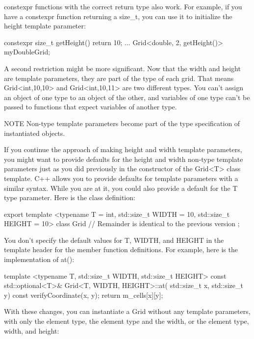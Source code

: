 constexpr functions with the correct return type also work. For example, if you have a constexpr function returning a size\_t, you can use it to initialize the height template parameter:

\begin{cpp}
constexpr size_t getHeight() { return 10; }
...
Grid<double, 2, getHeight()> myDoubleGrid;
\end{cpp}

A second restriction might be more significant. Now that the width and height are template parameters, they are part of the type of each grid. That means Grid<int,10,10> and Grid<int,10,11> are two different types. You can’t assign an object of one type to an object of the other, and variables of one type can’t be passed to functions that expect variables of another type.

\begin{myNotic}{NOTE}
Non-type template parameters become part of the type specification of instantiated objects.
\end{myNotic}


If you continue the approach of making height and width template parameters, you might want to provide defaults for the height and width non-type template parameters just as you did previously in the constructor of the Grid<T> class template. C++ allows you to provide defaults for template parameters with a similar syntax. While you are at it, you could also provide a default for the T type parameter. Here is the class definition:

\begin{cpp}
export template <typename T = int, std::size_t WIDTH = 10, std::size_t HEIGHT = 10>
class Grid
{
    // Remainder is identical to the previous version
};
\end{cpp}

You don’t specify the default values for T, WIDTH, and HEIGHT in the template header for the member function definitions. For example, here is the implementation of at():

\begin{cpp}
template <typename T, std::size_t WIDTH, std::size_t HEIGHT>
const std::optional<T>& Grid<T, WIDTH, HEIGHT>::at(
    std::size_t x, std::size_t y) const
{
    verifyCoordinate(x, y);
    return m_cells[x][y];
}
\end{cpp}

With these changes, you can instantiate a Grid without any template parameters, with only the element type, the element type and the width, or the element type, width, and height:

